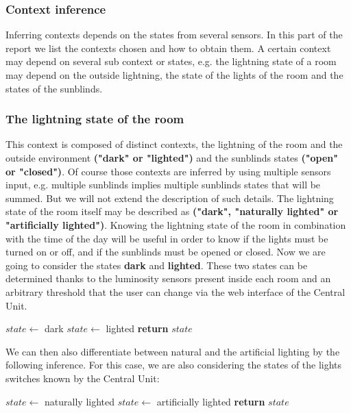 \documentclass{acm_proc_article-sp}
\begin{document}
\subsubsection{Context inference}
Inferring contexts depends on the states from several sensors. In this part of the report we list the contexts chosen and how to obtain them.
A certain context may depend on several sub context or states, 
e.g. the lightning state of a room may depend on the outside lightning, the state of the lights of the room and the states of the sunblinds.
\subsubsection*{The lightning state of the room}
 This context is composed of distinct contexts, the lightning of the room and the outside environment \textbf{("dark" or "lighted")} and the sunblinds states \textbf{("open" or "closed")}. 
 Of course those contexts are inferred by using multiple sensors input, e.g. multiple sunblinds implies multiple sunblinds states that will be summed. But we will not extend the description of such details.
 The lightning state of the room itself may be described as \textbf{("dark", "naturally lighted" or "artificially lighted")}.
 Knowing the lightning state of the room in combination with the time of the day will be useful in order to know if the lights must be turned on or off, and if the sunblinds must be opened or closed. Now we are going to consider the states \textbf{dark} and \textbf{lighted}. These two states can be determined thanks to the luminosity sensors present inside each room and an arbitrary threshold that the user can change via the web interface of the Central Unit.
 \begin{description}
  \begin{algorithm}
  \begin{algorithmic}
      \State $state\gets$ dark
    \Else
      \State $state\gets$ lighted
  \EndIf
  \State \textbf{return} $state$
  \end{algorithmic}
  \end{algorithm}
\end{description}
We can then also differentiate between natural and the artificial lighting by the following inference. For this case, we are also considering the states of the lights switches known by the Central Unit:
\begin{description}  
  \begin{algorithm}
  \begin{algorithmic}
	\State $state\gets$ naturally lighted
	\State $state\gets$ artificially lighted
      \EndIf
    \EndIf
  \State \textbf{return} $state$
  \end{algorithmic}
  \end{algorithm}
\end{description}
\end{document}

